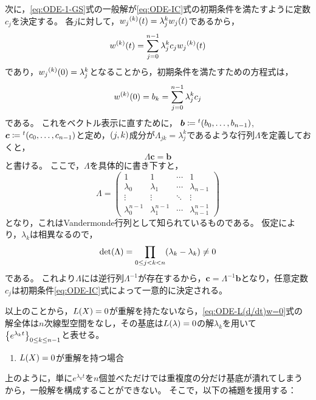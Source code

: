 \documentclass[a4paper,draft]{ltjsarticle}
\begin{document}
次に，\eqref{eq:ODE-1-GS}式の一般解が\eqref{eq:ODE-IC}式の初期条件を満たすように定数$c_j$を決定する。
各$j$に対して，$\diffun{w_j}{k}{t}=\lambda_j^k \fun{w_j}{t}$であるから，
\begin{equation}
    \diffun{w}{k}{t}=\sum_{j=0}^{n-1} \lambda_j^k c_j \diffun{w_j}{k}{t}
\end{equation}
であり，$\diffun{w_j}{k}{0}=\lambda_j^k$となることから，初期条件を満たすための方程式は，
\begin{equation}
    \diffun{w}{k}{0}=b_k = \sum_{j=0}^{n-1} \lambda_j^k c_j
\end{equation}
である。
これをベクトル表示に直すために，
$\bm{b}\coloneqq \trans{\pare{b_0,\dots,b_{n-1}}}$, $\bm{c}\coloneqq \trans{\pare{c_0,\dots,c_{n-1}}}$と定め，$\pare{j,k}$成分が$\Lambda_{jk}=\lambda_j^k$であるような行列$\Lambda$を定義しておくと，
\begin{equation}
    \Lambda \bm{c}=\bm{b}
\end{equation}
と書ける。
ここで，$\Lambda$を具体的に書き下すと，
\begin{equation}
    \Lambda = \begin{pmatrix}
        1 & 1 & \cdots & 1
        \\
        \lambda_0 & \lambda_1 & \cdots & \lambda_{n-1}
        \\
        \vdots & \vdots & \ddots & \vdots
        \\
        \lambda_0^{n-1} & \lambda_1^{n-1} & \cdots & \lambda_{n-1}^{n-1}
    \end{pmatrix}
\end{equation}
となり，これはVandermonde行列として知られているものである。
仮定により，$\lambda_k$は相異なるので，
\begin{equation}
    \fun{\det}{\Lambda}=\prod_{0\leq j < k<n} \pare{\lambda_k -\lambda_k}\ne0
\end{equation}
である。
これより$\Lambda$には逆行列$\Lambda^{-1}$が存在するから，$\bm{c}=\Lambda^{-1}\bm{b}$となり，任意定数$c_j$は初期条件\eqref{eq:ODE-IC}式によって一意的に決定される。

以上のことから，$\fun{L}{X}=0$が重解を持たないなら，\eqref{eq:ODE-L(d/dt)w=0}式の解全体は$n$次線型空間をなし，その基底は$\fun{L}{\lambda}=0$の解$\lambda_k$を用いて$\seq{e^{\lambda_k t}}{0\leq k\leq n-1}$と表せる。

\begin{enumerate}[resume,label=(\roman*)]
    \item $\fun{L}{X}=0$が重解を持つ場合
\end{enumerate}
上のように，単に$e^{\lambda_k t}$を$n$個並べただけでは重複度の分だけ基底が潰れてしまうから，一般解を構成することができない。
そこで，以下の補題を援用する：
\end{document}
